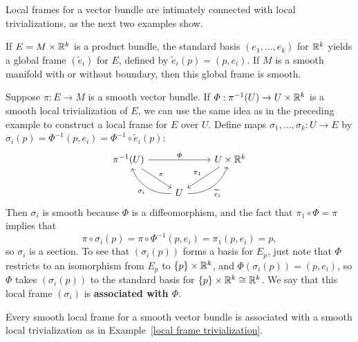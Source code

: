 Local frames for a vector bundle are intimately connected with local trivializations, as the next two examples show.
\begin{example}
If $E=M\times\mathbb{R}^k$ is a product bundle, the standard basis $(e_1,\dots,e_k)$ for $\mathbb{R}^k$ yields a global frame $(\widetilde{e}_i)$ for $E$, defined by $\widetilde{e}_i(p)=(p,e_i)$. If $M$ is a smooth manifold with or without
boundary, then this global frame is smooth.
\end{example}
\begin{example}\label{local frame trivialization}
Suppose $\pi:E\to M$ is a smooth vector bundle. If $\varPhi:\pi^{-1}(U)\to U\times\mathbb{R}^k$ is a smooth local trivialization of $E$, we can use the same idea as in the preceding example to construct a local frame for $E$ over $U$. Define maps $\sigma_1,\dots,\sigma_k:U\to E$ by $\sigma_i(p)=\varPhi^{-1}(p,e_i)=\varPhi^{-1}\circ\widetilde{e}_i(p)$:
\[\begin{tikzcd}
\pi^{-1}(U)\ar[rd,"\pi"]\ar[rr,"\varPhi"]&&U\times\R^k\ar[ld,swap,"\pi_1"]\\
&U\ar[lu,bend left=35,"\sigma_i"]\ar[ru,bend right=35,swap,"\widetilde{e}_i"]&
\end{tikzcd}\]
Then $\sigma_i$ is smooth because $\varPhi$ is a diffeomorphism, and the fact that $\pi_1\circ\varPhi=\pi$ implies that
\[\pi\circ\sigma_i(p)=\pi\circ\varPhi^{-1}(p,e_i)=\pi_1(p,e_i)=p,\]
so $\sigma_i$ is a section. To see that $(\sigma_i(p))$ forms a basis for $E_p$, just note that $\varPhi$ restricts to an isomorphism from $E_p$ to $\{p\}\times\mathbb{R}^k$, and $\varPhi(\sigma_i(p))=(p,e_i)$, so $\varPhi$ takes $(\sigma_i(p))$ to the standard basis for $\{p\}\times\mathbb{R}^k\cong\mathbb{R}^k$. We say that this local frame $(\sigma_i)$ is \textbf{associated with $\bm{\varPhi}$}.
\end{example}
\begin{proposition}\label{local frame iff trivialization}
Every smooth local frame for a smooth vector bundle is associated
with a smooth local trivialization as in Example~\ref{local frame trivialization}.
\end{proposition}
